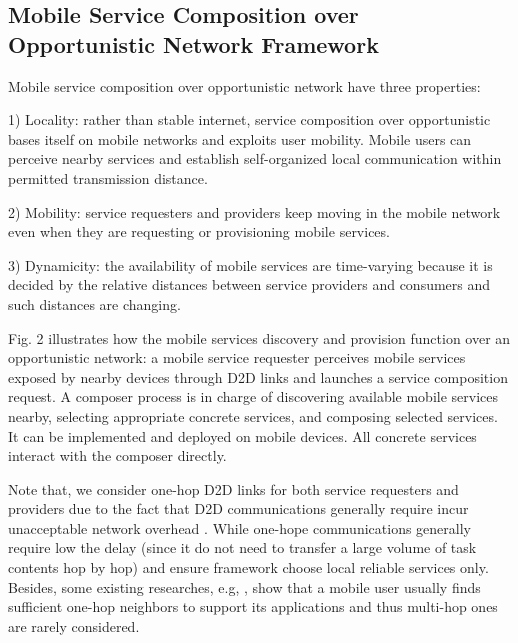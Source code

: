 \documentclass[journal]{IEEEtran}
\begin{document}
\subsection{Mobile Service Composition over Opportunistic Network Framework}

Mobile service composition over opportunistic network have three properties:

1) Locality: rather than stable internet, service composition over opportunistic bases itself on mobile networks and exploits user mobility. Mobile users can perceive nearby services and establish self-organized local communication within permitted transmission distance.

2) Mobility: service requesters and providers keep moving in the mobile network even when they are requesting or provisioning mobile services.

3) Dynamicity: the availability of mobile services are time-varying because it is decided by the relative distances between service providers and consumers and such distances are changing.

Fig. 2 illustrates how the mobile services discovery and provision function over an opportunistic network: a mobile service requester perceives mobile services exposed by nearby devices through D2D links and launches a service composition request. A composer process is in charge of discovering available mobile services nearby, selecting appropriate concrete services, and composing selected services. It can be implemented and deployed on mobile devices. All concrete services interact with the composer directly.

Note that, we consider one-hop D2D links for both service requesters and providers due to the fact that D2D communications generally require incur unacceptable network overhead \cite{li2014can}. While one-hope communications generally require low the delay (since it do not need to transfer a large volume of task contents hop by hop) and ensure framework choose local reliable services only.
Besides, some existing researches, e.g, \cite{chang2015progressive, tuncay2013participant, wu2013homing, jiang2016exploiting, liu2013exploring}, show that a mobile user usually finds sufficient one-hop neighbors to support its applications and thus multi-hop ones are rarely considered.

\end{document}
